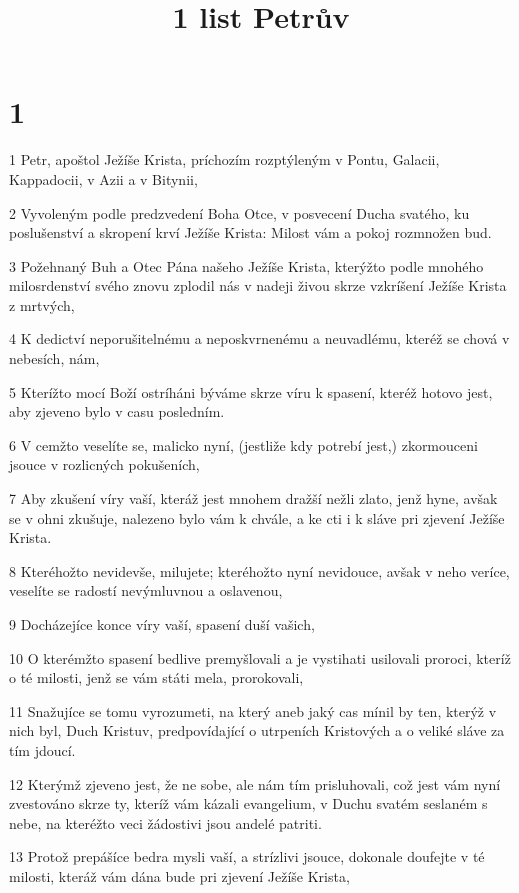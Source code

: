

\title{1 list Petrův}

\chapter{1}

\par 1 Petr, apoštol Ježíše Krista, príchozím rozptýleným v Pontu, Galacii, Kappadocii, v Azii a v Bitynii,
\par 2 Vyvoleným podle predzvedení Boha Otce, v posvecení Ducha svatého, ku poslušenství a skropení krví Ježíše Krista: Milost vám a pokoj rozmnožen bud.
\par 3 Požehnaný Buh a Otec Pána našeho Ježíše Krista, kterýžto podle mnohého milosrdenství svého znovu zplodil nás v nadeji živou skrze vzkríšení Ježíše Krista z mrtvých,
\par 4 K dedictví neporušitelnému a neposkvrnenému a neuvadlému, kteréž se chová v nebesích, nám,
\par 5 Kterížto mocí Boží ostríháni býváme skrze víru k spasení, kteréž hotovo jest, aby zjeveno bylo v casu posledním.
\par 6 V cemžto veselíte se, malicko nyní, (jestliže kdy potrebí jest,) zkormouceni jsouce v rozlicných pokušeních,
\par 7 Aby zkušení víry vaší, kteráž jest mnohem dražší nežli zlato, jenž hyne, avšak se v ohni zkušuje, nalezeno bylo vám k chvále, a ke cti i k sláve pri zjevení Ježíše Krista.
\par 8 Kteréhožto nevidevše, milujete; kteréhožto nyní nevidouce, avšak v neho veríce, veselíte se radostí nevýmluvnou a oslavenou,
\par 9 Docházejíce konce víry vaší, spasení duší vašich,
\par 10 O kterémžto spasení bedlive premyšlovali a je vystihati usilovali proroci, kteríž o té milosti, jenž se vám státi mela, prorokovali,
\par 11 Snažujíce se tomu vyrozumeti, na který aneb jaký cas mínil by ten, kterýž v nich byl, Duch Kristuv, predpovídající o utrpeních Kristových a o veliké sláve za tím jdoucí.
\par 12 Kterýmž zjeveno jest, že ne sobe, ale nám tím prisluhovali, což jest vám nyní zvestováno skrze ty, kteríž vám kázali evangelium, v Duchu svatém seslaném s nebe, na kteréžto veci žádostivi jsou andelé patriti.
\par 13 Protož prepášíce bedra mysli vaší, a strízlivi jsouce, dokonale doufejte v té milosti, kteráž vám dána bude pri zjevení Ježíše Krista,
